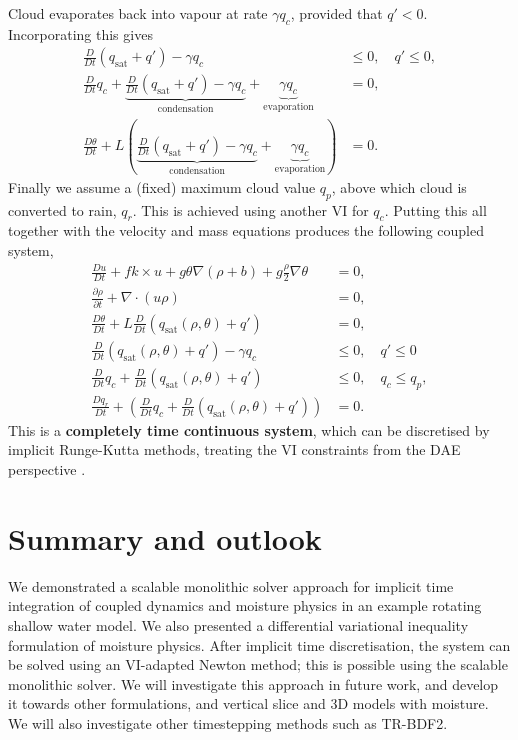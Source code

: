 \documentclass[
]{ImperialPoster}
\DeclareMathOperator{\sat}{sat}
\newcommand{\pp}[2]{\frac{\partial #1}{\partial #2}}
\newcommand{\DD}[2]{\frac{D #1}{D #2}}
\begin{document}
\begin{multicols}{3}
Cloud evaporates back into vapour at rate $\gamma q_c$, provided that
$q'<0$. Incorporating this gives
\begin{align*}
  \DD{}{t}(q_{\sat}+q') - \gamma q_c & \leq 0, \quad
  q' \leq 0, \\
  \DD{}{t}q_c + \underbrace{\DD{}{t}(q_{\sat}+q') - \gamma q_c}_{\mbox{condensation}} + \underbrace{\gamma q_c}_{\mbox{evaporation}} & = 0, \\
  \DD{\theta}{t} + L\left(
  \underbrace{\DD{}{t}(q_{\sat}+q') - \gamma q_c}_{\mbox{condensation}} + \underbrace{\gamma q_c}_{\mbox{evaporation}}\right) & = 0.
\end{align*}
Finally we assume a (fixed) maximum cloud value $q_p$, above which
cloud is converted to rain, $q_r$. This is achieved using another VI
for $q_c$. Putting this all together with the velocity and mass
equations produces the following coupled system,
\begin{align*}
  \DD{u}{t} + fk\times u + g\theta \nabla (\rho+b) + g\frac{\rho}{2}\nabla \theta
  & = 0, \\
  \pp{\rho}{t} + \nabla\cdot(u\rho) & = 0, \\
  \DD{\theta}{t} + L\DD{}{t}(q_{\sat}(\rho,\theta)+q') & = 0, \\
  \DD{}{t}(q_{\sat}(\rho,\theta)+q') - \gamma q_c & \leq 0, \quad q'\leq 0 \\
  \DD{}{t}q_c + \DD{}{t}(q_{\sat}(\rho,\theta)+q') & \leq 0, \quad
  q_c \leq q_p, \\
  \DD{q_r}{t} + \left(\DD{}{t}q_c + \DD{}{t}(q_{\sat}(\rho,\theta)+q')\right) & = 0.
\end{align*}
This is a
{\bfseries completely time continuous system}, which can be discretised by
implicit Runge-Kutta methods, treating
the VI constraints from the DAE perspective \cite{kirby2024extending}.

\section{Summary and outlook}

We demonstrated a scalable monolithic solver approach for implicit
time integration of coupled dynamics and moisture physics in an
example rotating shallow water model.  We also presented a
differential variational inequality formulation of moisture
physics. After implicit time discretisation, the system can be solved
using an VI-adapted Newton method; this is possible using the scalable
monolithic solver. We will investigate this approach in future work,
and develop it towards other formulations, and vertical slice and 3D
models with moisture. We will also investigate other timestepping methods
such as TR-BDF2.


\end{multicols}
\end{document}
